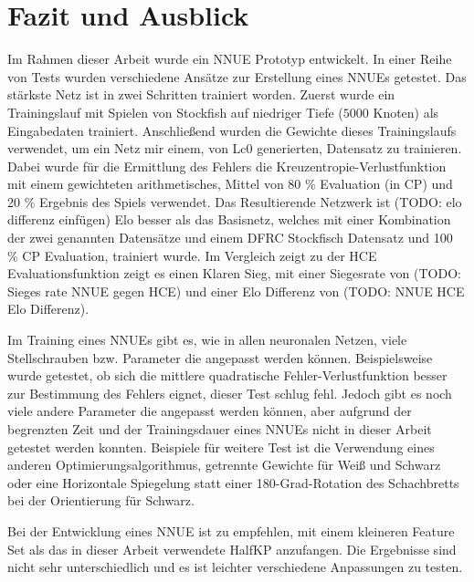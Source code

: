 \chapter{Fazit und Ausblick}

Im Rahmen dieser Arbeit wurde ein \ac{NNUE} Prototyp entwickelt. In einer Reihe von Tests wurden verschiedene Ansätze zur Erstellung eines \acp{NNUE} getestet. Das stärkste Netz ist in zwei Schritten trainiert worden. Zuerst wurde ein Trainingslauf mit Spielen von Stockfish auf niedriger Tiefe ($5000$ Knoten) als Eingabedaten trainiert. Anschließend wurden die Gewichte dieses Trainingslaufs verwendet, um ein Netz mir einem, von \ac{Lc0} generierten, Datensatz zu trainieren. Dabei wurde für die Ermittlung des Fehlers die Kreuzentropie-Verlustfunktion mit einem gewichteten arithmetisches, Mittel von 80 \% Evaluation (in \ac{CP}) und 20 \% Ergebnis des Spiels verwendet. Das Resultierende Netzwerk ist (TODO: elo differenz einfügen) Elo besser als das Basisnetz, welches mit einer Kombination der zwei genannten Datensätze und einem \ac{DFRC} Stockfisch Datensatz und 100 \% \ac{CP} Evaluation, trainiert wurde. Im Vergleich zeigt zu der \ac{HCE} Evaluationsfunktion zeigt es einen Klaren Sieg, mit einer Siegesrate von (TODO: Sieges rate NNUE gegen HCE) und einer Elo Differenz von (TODO: NNUE HCE Elo Differenz). 

Im Training eines \acp{NNUE} gibt es, wie in allen neuronalen Netzen, viele Stellschrauben bzw. Parameter die angepasst werden können. Beispielsweise wurde getestet, ob sich die mittlere quadratische Fehler-Verlustfunktion besser zur Bestimmung des Fehlers eignet, dieser Test schlug fehl. Jedoch gibt es noch viele andere Parameter die angepasst werden können, aber aufgrund der begrenzten Zeit und der Trainingsdauer eines \acp{NNUE} nicht in dieser Arbeit getestet werden konnten. Beispiele für weitere Test ist \zb{} die Verwendung eines anderen Optimierungsalgorithmus, getrennte Gewichte für Weiß und Schwarz oder eine Horizontale Spiegelung statt einer 180-Grad-Rotation des Schachbretts bei der Orientierung für Schwarz.

Bei der Entwicklung eines \ac{NNUE} ist zu empfehlen, mit einem kleineren Feature Set als das in dieser Arbeit verwendete HalfKP anzufangen. Die Ergebnisse sind nicht sehr unterschiedlich und es ist leichter verschiedene Anpassungen zu testen.

